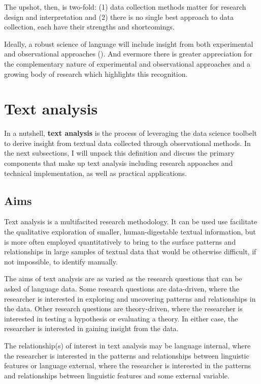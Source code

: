 \documentclass[
  letterpaper,
  krantz1]{latex/krantz-mod}
\theoremstyle{definition}
\theoremstyle{definition}
\theoremstyle{remark}
\begin{document}
The upshot, then, is two-fold: (1) data collection methods matter for
research design and interpretation and (2) there is no single best
approach to data collection, each have their strengths and shortcomings.

Ideally, a robust science of language will include insight from both
experimental and observational approaches
(). And evermore there
is greater appreciation for the complementary nature of experimental and
observational approaches and a growing body of research which highlights
this recognition.

\section{Text analysis}\label{text-analysis}

In a nutshell, \textbf{text analysis} is the
process of leveraging the data science toolbelt to derive insight from
textual data collected through observational methods. In the next
subsections, I will unpack this definition and discuss the primary
components that make up text analysis including research appoaches and
technical implementation, as well as practical applications.

\subsection{Aims}\label{aims}

Text analysis is a multifacited research methodology. It can be used use
facilitate the qualitative exploration of smaller, human-digestable
textual information, but is more often employed quantitatively to bring
to the surface patterns and relationships in large samples of textual
data that would be otherwise difficult, if not impossible, to identify
manually.

The aims of text analysis are as varied as the research questions that
can be asked of language data. Some research questions are data-driven,
where the researcher is interested in exploring and uncovering patterns
and relationships in the data. Other research questions are
theory-driven, where the researcher is interested in testing a
hypothesis or evaluating a theory. In either case, the researcher is
interested in gaining insight from the data.

The relationship(s) of interest in text analysis may be language
internal, where the researcher is interested in the patterns and
relationships between linguistic features or language external, where
the researcher is interested in the patterns and relationships between
linguistic features and some external variable.
\end{document}
